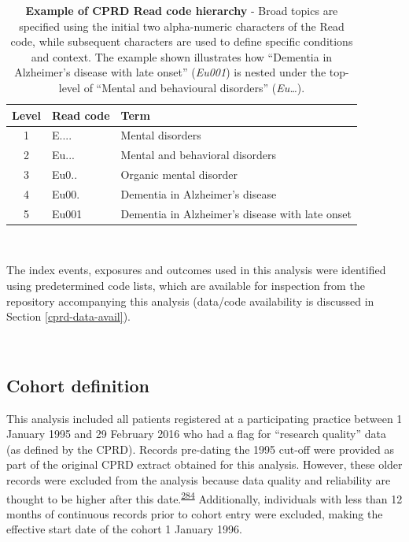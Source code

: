 \documentclass[a4paper, twoside]{templates/ociamthesis}
\begin{document}
\begin{table}[H]

\caption[Example of CPRD Read code hierarchy]{\label{tab:readExample-table}\textbf{Example of CPRD Read code hierarchy} - Broad topics are specified using the initial two alpha-numeric characters of the Read code, while subsequent characters are used to define specific conditions and context. The example shown illustrates how ``Dementia in Alzheimer's disease with late onset'' (\emph{Eu001}) is nested under the top-level of ``Mental and behavioural disorders'' (\emph{Eu\ldots{}}).}
\centering
\begin{tabular}[t]{cll}
\toprule
\textbf{Level} & \textbf{Read code} & \textbf{Term}\\
\midrule
1 & E.... & Mental disorders\\
2 & Eu... & Mental and behavioral disorders\\
3 & Eu0.. & Organic mental disorder\\
4 & Eu00. & Dementia in Alzheimer's disease\\
5 & Eu001 & Dementia in Alzheimer's disease with late onset\\
\bottomrule
\end{tabular}
\end{table}

~

The index events, exposures and outcomes used in this analysis were identified using predetermined code lists, which are available for inspection from the repository accompanying this analysis (data/code availability is discussed in Section \ref{cprd-data-avail}).

~

\hypertarget{cohort-definition}{%
\subsection{Cohort definition}\label{cohort-definition}}

This analysis included all patients registered at a participating practice between 1 January 1995 and 29 February 2016 who had a flag for ``research quality'' data (as defined by the CPRD). Records pre-dating the 1995 cut-off were provided as part of the original CPRD extract obtained for this analysis. However, these older records were excluded from the analysis because data quality and reliability are thought to be higher after this date.\textsuperscript{\protect\hyperlink{ref-wolf2019}{284}} Additionally, individuals with less than 12 months of continuous records prior to cohort entry were excluded, making the effective start date of the cohort 1 January 1996.
\end{document}
